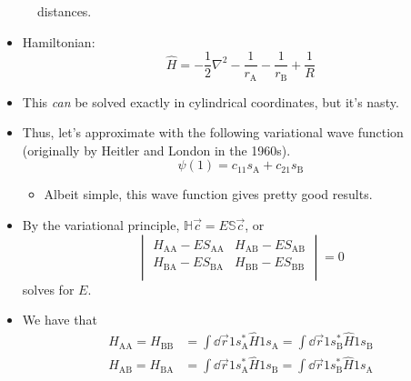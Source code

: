 \documentclass[../notes.tex]{subfiles}
\begin{document}
\begin{itemize}
\begin{figure}[h!]
        \caption{ distances.}
        \label{fig:H2plusDistances}
    \end{figure}
    \begin{itemize}
        \item Hamiltonian:
        \begin{equation*}
            \hat{H} = -\frac{1}{2}\nabla^2-\frac{1}{r_\text{A}}-\frac{1}{r_\text{B}}+\frac{1}{R}
        \end{equation*}
        \item This \emph{can} be solved exactly in cylindrical coordinates, but it's nasty.
        \item Thus, let's approximate with the following variational wave function (originally by Heitler and London in the 1960s).
        \begin{equation*}
            \psi(1) = c_11s_\text{A}+c_21s_\text{B}
        \end{equation*}
        \begin{itemize}
            \item Albeit simple, this wave function gives pretty good results.
        \end{itemize}
        \item By the variational principle, $\mathbb{H}\vec{c}=E\mathbb{S}\vec{c}$, or
        \begin{equation*}
            \begin{vmatrix}
                H_{\text{A}\text{A}}-ES_{\text{A}\text{A}} & H_{\text{A}\text{B}}-ES_{\text{A}\text{B}}\\
                H_{\text{B}\text{A}}-ES_{\text{B}\text{A}} & H_{\text{B}\text{B}}-ES_{\text{B}\text{B}}\\
            \end{vmatrix}
            = 0
        \end{equation*}
        solves for $E$.
        \item We have that
        \begin{align*}
            H_{\text{A}\text{A}} = H_{\text{B}\text{B}} &= \int\dd{\vec{r}}1s_\text{A}^*\hat{H}1s_\text{A} = \int\dd{\vec{r}}1s_\text{B}^*\hat{H}1s_\text{B}\\
            H_{\text{A}\text{B}} = H_{\text{B}\text{A}} &= \int\dd{\vec{r}}1s_\text{A}^*\hat{H}1s_\text{B} = \int\dd{\vec{r}}1s_\text{B}^*\hat{H}1s_\text{A}\\

\end{align*}
\end{itemize}
\end{itemize}
\end{document}
